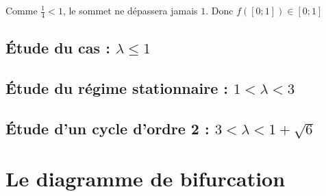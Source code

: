 Comme $\frac{1}{4} < 1$, le sommet ne dépassera jamais $1$. Donc $\boxed{f([0;1]) \in[0;1]}$

\subsection{\'Etude du cas : \texorpdfstring{$\lambda \leq 1$}{Lg}}

\subsection{\'Etude du régime stationnaire : \texorpdfstring{$1 < \lambda < 3$}{Lg}}
\subsection{\'Etude d'un cycle d'ordre 2 : \texorpdfstring{$3 < \lambda < 1+\sqrt{6}$}{Lg}}

\section{Le diagramme de bifurcation}